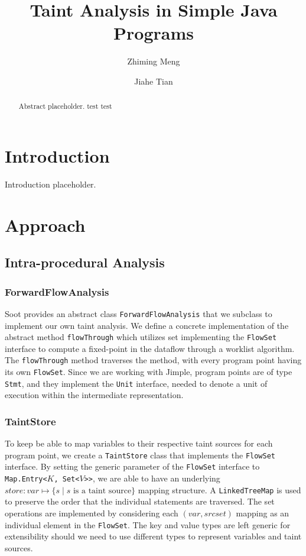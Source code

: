 \documentclass[acmsmall]{acmart}
\begin{document}
\title{Taint Analysis in Simple Java Programs}

\author{Zhiming Meng}

\author{Jiahe Tian}

\begin{abstract}
    Abstract placeholder. test test
\end{abstract}

\maketitle

\section{Introduction}
Introduction placeholder.

\section{Approach}
\subsection{Intra-procedural Analysis}
\subsubsection{ForwardFlowAnalysis} Soot provides an abstract class \texttt{ForwardFlowAnalysis} that we subclass to implement our own taint analysis. We define a concrete implementation of the abstract method \texttt{flowThrough} which utilizes set implementing the \texttt{FlowSet} interface to compute a fixed-point in the dataflow through a worklist algorithm. The \texttt{flowThrough} method traverses the method, with every program point having its own \texttt{FlowSet}. Since we are working with Jimple, program points are of type \texttt{Stmt}, and they implement the \texttt{Unit} interface, needed to denote a unit of execution within the intermediate representation.

\subsubsection{TaintStore} To keep be able to map variables to their respective taint sources for each program point, we create a \texttt{TaintStore} class that implements the \texttt{FlowSet} interface. By setting the generic parameter of the \texttt{FlowSet} interface to \texttt{Map.Entry<$K$, Set<$V$>{}>}, we are able to have an underlying $store:var \mapsto \{s \mid s \text{ is a taint source}\}$ mapping structure. A \texttt{LinkedTreeMap} is used to preserve the order that the individual statements are traversed. The set operations are implemented by considering each $(var, srcset)$ mapping as an individual element in the \texttt{FlowSet}. The key and value types are left generic for extensibility should we need to use different types to represent variables and taint sources.
\end{document}
